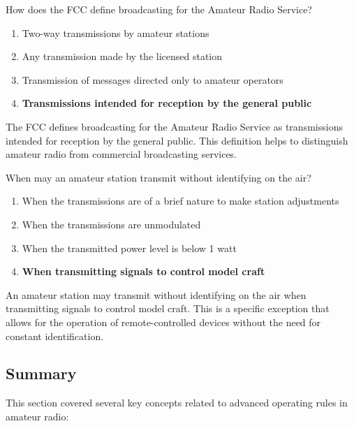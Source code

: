 
\begin{tcolorbox}[colback=gray!10!white,colframe=black!75!black,title={T1D10}]
    How does the FCC define broadcasting for the Amateur Radio Service?
    \begin{enumerate}[label=\Alph*),noitemsep]
        \item Two-way transmissions by amateur stations
        \item Any transmission made by the licensed station
        \item Transmission of messages directed only to amateur operators
        \item \textbf{Transmissions intended for reception by the general public}
    \end{enumerate}
\end{tcolorbox}
The FCC defines broadcasting for the Amateur Radio Service as transmissions intended for reception by the general public. This definition helps to distinguish amateur radio from commercial broadcasting services.


\begin{tcolorbox}[colback=gray!10!white,colframe=black!75!black,title={T1D11}]
    When may an amateur station transmit without identifying on the air?
    \begin{enumerate}[label=\Alph*),noitemsep]
        \item When the transmissions are of a brief nature to make station adjustments
        \item When the transmissions are unmodulated
        \item When the transmitted power level is below 1 watt
        \item \textbf{When transmitting signals to control model craft}
    \end{enumerate}
\end{tcolorbox}
An amateur station may transmit without identifying on the air when transmitting signals to control model craft. This is a specific exception that allows for the operation of remote-controlled devices without the need for constant identification.


\subsection*{Summary}
This section covered several key concepts related to advanced operating rules in amateur radio:

